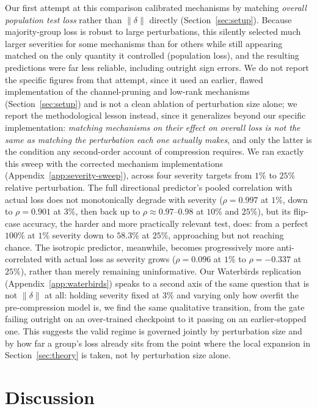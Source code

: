 \documentclass{article}
\begin{document}
Our first attempt at this comparison calibrated mechanisms by matching \emph{overall population test loss} rather than $\|\delta\|$ directly (Section~\ref{sec:setup}). Because majority-group loss is robust to large perturbations, this silently selected much larger severities for some mechanisms than for others while still appearing matched on the only quantity it controlled (population loss), and the resulting predictions were far less reliable, including outright sign errors. We do not report the specific figures from that attempt, since it used an earlier, flawed implementation of the channel-pruning and low-rank mechanisms (Section~\ref{sec:setup}) and is not a clean ablation of perturbation size alone; we report the methodological lesson instead, since it generalizes beyond our specific implementation: \emph{matching mechanisms on their effect on overall loss is not the same as matching the perturbation each one actually makes}, and only the latter is the condition any second-order account of compression requires. We ran exactly this sweep with the corrected mechanism implementations (Appendix~\ref{app:severity-sweep}), across four severity targets from $1\%$ to $25\%$ relative perturbation. The full directional predictor's pooled correlation with actual loss does not monotonically degrade with severity ($\rho=0.997$ at $1\%$, down to $\rho=0.901$ at $3\%$, then back up to $\rho\approx0.97$--$0.98$ at $10\%$ and $25\%$), but its flip-case accuracy, the harder and more practically relevant test, does: from a perfect $100\%$ at $1\%$ severity down to $58.3\%$ at $25\%$, approaching but not reaching chance. The isotropic predictor, meanwhile, becomes progressively more anti-correlated with actual loss as severity grows ($\rho=0.096$ at $1\%$ to $\rho=-0.337$ at $25\%$), rather than merely remaining uninformative. Our Waterbirds replication (Appendix~\ref{app:waterbirds}) speaks to a second axis of the same question that is not $\|\delta\|$ at all: holding severity fixed at $3\%$ and varying only how overfit the pre-compression model is, we find the same qualitative transition, from the gate failing outright on an over-trained checkpoint to it passing on an earlier-stopped one. This suggests the valid regime is governed jointly by perturbation size and by how far a group's loss already sits from the point where the local expansion in Section~\ref{sec:theory} is taken, not by perturbation size alone.

\section{Discussion}
\label{sec:discussion}
\end{document}
